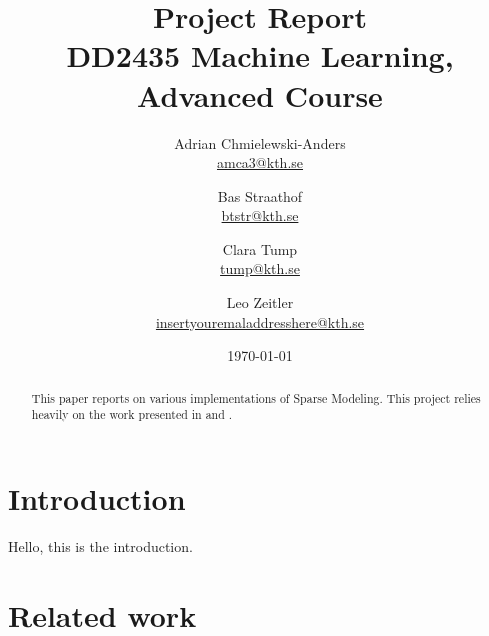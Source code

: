 \documentclass[letterpaper,11pt]{article}
\begin{document}
\title{Project Report \\ DD2435 Machine Learning, Advanced Course}
\author{
    Adrian Chmielewski-Anders \\
    \href{mailto:amca3@kth.se}{amca3@kth.se}
    \and
    Bas Straathof \\
    \href{mailto:btstr@kth.se}{btstr@kth.se}
    \and
    Clara Tump \\
    \href{mailto:tump@kth.se}{tump@kth.se}
    \and
    Leo Zeitler \\
    \href{mailto:insertyouremaladdresshere@kth.se}{insertyouremaladdresshere@kth.se}
}

\date{\today}
\maketitle


\begin{abstract}
\noindent This paper reports on various implementations of Sparse Modeling. This project relies heavily on the work presented in  \cite{tipping2000relevance} and \cite{tipping2001sparse}.
\end{abstract}
\vspace{-.3cm}

\section{Introduction}
\vspace{-.3cm}
Hello, this is the introduction.\\

\vspace{-.3cm}
\section{Related work}
\vspace{-.3cm}


\newpage
{\small


}
\end{document}
